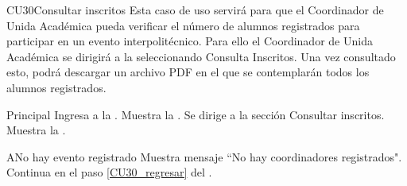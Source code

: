 \begin{UseCase}{CU30}{Consultar inscritos}{
		\noindent Esta caso de uso servirá para que el Coordinador de Unida Académica pueda verificar el número de alumnos registrados para participar en un evento interpolitécnico.
		Para ello el Coordinador de Unida Académica se dirigirá a la  seleccionando Consulta Inscritos. Una vez consultado esto, podrá descargar un archivo PDF en el que se contemplarán todos los alumnos registrados.
	} \label{CU30_evento}

		\end{UseCase}
	
    \begin{UCtrayectoria}{Principal}
    \UCpaso[\UCactor] Ingresa a la .
    \UCpaso Muestra la . \label{CU30_regresar}
    \UCpaso[\UCactor] Se dirige a la sección Consultar inscritos.  
    \UCpaso Muestra la . 
    \end{UCtrayectoria}
    
    \begin{UCtrayectoriaA}{A}{No hay evento registrado}
    	\UCpaso Muestra mensaje “No hay coordinadores registrados".
    	\UCpaso Continua en el paso \ref{CU30_regresar} del .
    \end{UCtrayectoriaA}


	


